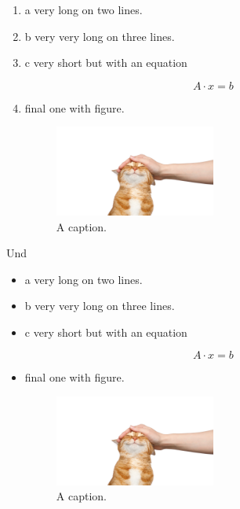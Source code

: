 \begin{enumerate}
\item a very long 
on two lines.

\item b very very long 
 on three
 lines.

\item c very short but 
 with an equation 

\begin{equation}
A \cdot x = b
\label{eq:eqinItem1}
\end{equation}

\item final one with figure.

\begin{figure}
\centering
\includegraphics[width=0.5\textwidth]{cat.png}
\caption{A caption.}
\end{figure}

\end{enumerate}

Und 

\begin{itemize}
\item a very long 
on two lines.

\item b very very long 
 on three
 lines.

\item c very short but 
 with an equation 

\begin{equation}
A \cdot x = b
\label{eq:eqinItem2}
\end{equation}

\item final one with figure.

\begin{figure}
\centering
\includegraphics[width=0.5\textwidth]{cat.png}
\caption{A caption.}
\end{figure}

\end{itemize}

